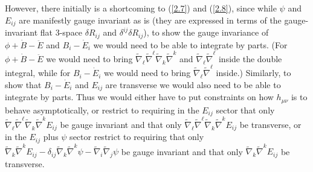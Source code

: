 However, there initially is a shortcoming to (\ref{2.7}) and (\ref{2.8}), since while $\psi$ and $E_{ij}$ are manifestly gauge invariant as is (they are expressed in terms of the gauge-invariant flat 3-space $\delta R_{ij}$ and $\delta^{ij}\delta R_{ij}$), to show the gauge invariance of $\phi+\dot{B}-\ddot{E}$ and $B_i -\dot{E}_i$ we would need to be able to integrate by parts. (For $\phi+\dot{B}-\ddot{E}$  we would need to bring $\tilde{\nabla}_{\ell}\tilde{\nabla}^{\ell} \tilde{\nabla}_k\tilde{\nabla}^k$ and $\tilde{\nabla}_{\ell}\tilde{\nabla}^{\ell}$ inside the double integral, while for $B_i-\dot{E}_i$ we would need to bring $\tilde{\nabla}_{\ell}\tilde{\nabla}^{\ell}$ inside.) Similarly, to show that $B_i -\dot{E}_i$ and $E_{ij}$ are transverse we would also need to be able to integrate by parts. Thus we would either have to put constraints on how $h_{\mu\nu}$ is to behave asymptotically, or restrict to requiring in the $E_{ij}$ sector that only $\tilde{\nabla}_{\ell}\tilde{\nabla}^{\ell}\tilde{\nabla}_k\tilde{\nabla}^kE_{ij}$ be gauge invariant and that only $\tilde{\nabla}_{\ell}\tilde{\nabla}^{\ell}\tilde{\nabla}_k\tilde{\nabla}^kE_{ij}$ be transverse, or in the $E_{ij}$ plus $\psi$ sector restrict to requiring that only $\tilde{\nabla}_k\tilde{\nabla}^kE_{ij}-\delta_{ij}\tilde{\nabla}_k\tilde{\nabla}^k\psi-\tilde{\nabla}_i\tilde{\nabla}_j\psi$ be gauge invariant and that only $\tilde{\nabla}_k\tilde{\nabla}^kE_{ij}$ be transverse. 

